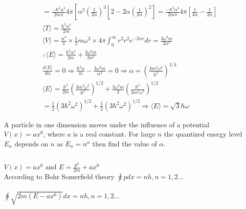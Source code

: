 \begin{enumerate}
\begin{answer}
\begin{align*}
		&=\frac{-\hbar^{2} \alpha^{3}}{2 m \pi} 4 \pi\left[\alpha^{2}\left(\frac{1}{2 \alpha}\right)^{3}\left\lfloor 2-2 \alpha\left(\frac{1}{2 \alpha}\right)^{2}\right]=\frac{-\hbar^{2} \alpha^{3}}{2 m \pi} 4 \pi\left[\frac{1}{4 \alpha}-\frac{1}{2 \alpha}\right]\right.\\
		&\langle T\rangle=\frac{\hbar^{2} \alpha^{2}}{2 m} \\
		&\langle V\rangle=\frac{\alpha^{3}}{\pi} \times \frac{1}{2} m \omega^{2} \times 4 \pi \int_{0}^{\infty} r^{2} r^{2} e^{-2 \alpha r} d r=\frac{3 \omega^{2} m}{2 \alpha^{2}} \\
		&\therefore\langle E\rangle=\frac{\hbar^{2} \alpha^{2}}{2 m}+\frac{3 \omega^{2} m}{2 \alpha^{2}}\\
		&\frac{d\langle E\rangle}{d \alpha}=0 \Rightarrow \frac{\hbar^{2} \alpha}{m}-\frac{3 \omega^{2} m}{\alpha^{3}}=0 \Rightarrow \alpha=\left(\frac{3 m^{2} \omega^{2}}{\hbar^{2}}\right)^{1 / 4} \\
		&\langle E\rangle=\frac{\hbar^{2}}{2 m}\left(\frac{3 m^{2} \omega^{2}}{\hbar^{2}}\right)^{1 / 2}+\frac{3 \omega^{2} m}{2}\left(\frac{\hbar^{2}}{3 m^{2} \omega^{2}}\right)^{1 / 2} \\
		&=\frac{1}{2}\left(3 \hbar^{2} \omega^{2}\right)^{1 / 2}+\frac{1}{2}\left(3 \hbar^{2} \omega^{2}\right)^{1 / 2} \Rightarrow\langle E\rangle=\sqrt{3} \hbar \omega
	\end{align*}
\end{answer}
	\begin{minipage}{\textwidth}
	\item A particle in one dimension moves under the influence of a potential $V(x)=a x^{6}$, where $a$ is a real constant. For large $n$ the quantized energy level $E_{n}$ depends on $n$ as $E_{n}=n^{\alpha}$ then find the value of $\alpha$.
\end{minipage}
\begin{answer}$\left. \right. $\\
	\begin{minipage}{0.5\textwidth}
	$V(x)=a x^{6} \text { and } E=\frac{p^{2}}{2 m}+a x^{6}$\\
	According to Bohr Somerfield theory $\oint p d x=n h, n=1,2 \ldots$\\\\
	$
	\oint \sqrt{2 m\left(E-a x^{6}\right)} d x=n h, n=1,2 \ldots
	$
	\end{minipage}
	 \begin{minipage}{0.5\textwidth}
	 \begin{figure}[H]
	 	\centering

\end{figure}
\end{minipage}
\end{answer}
\end{enumerate}

